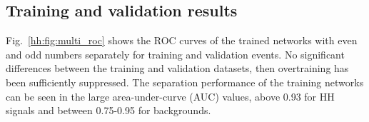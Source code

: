 \documentclass[../main.tex]{subfiles}
\begin{document}
\subsection{Training and validation results}

Fig.~\ref{hh:fig:multi_roc} shows the ROC curves of the trained networks with even and odd numbers separately for training and validation events. No significant differences between the training and validation datasets, then overtraining has been sufficiently suppressed. The separation performance of the training networks can be seen in the large area-under-curve (AUC) values, above 0.93 for HH signals and between 0.75-0.95 for backgrounds.

\begin{figure}[h!]
\begin{center}
 \\

\end{center}
\end{figure}
\end{document}
